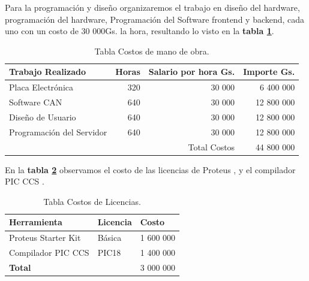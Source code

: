 Para la programación  y diseño organizaremos el trabajo en diseño del hardware, programación del hardware, Programación del Software frontend y backend, cada uno con un costo de 30 000Gs. la hora, resultando lo visto en la \textbf{tabla \ref{tabla:software}}. 

\begin{table}[H]
\begin{center}
\begin{tabular}{|l|r|r|r|}
\hline
\textbf{Trabajo Realizado} & \textbf{Horas}&\textbf{Salario por hora Gs.} & \textbf{Importe Gs.} \\ \hline

 Placa Electrónica & 320 & 30 000  & 6 400 000     \\ \hline
 Software CAN      & 640 & 30 000  & 12 800 000     \\ \hline
 Diseño de Usuario & 640 & 30 000  & 12 800 000     \\ \hline
 Programación del Servidor & 640 & 30 000 & 12 800 000 \\ \hline 
  &  & Total Costos & 44 800 000 \\ \hline 

\end{tabular}
\caption{Tabla Costos de mano de obra.}
\label{tabla:software}
\end{center}
\end{table}



En la \textbf{tabla \ref{tabla:licencias}} observamos el costo de las licencias de Proteus  \cite{licenp}, y el compilador PIC CCS \cite{pic_ccs}.
\begin{table}[H]
\begin{center}
\begin{tabular}{|l|l|l|}
\hline
\textbf{Herramienta} & \textbf{Licencia} & \textbf{Costo}  \\ \hline
Proteus Starter Kit  & Básica & 1 600 000  \\ \hline
Compilador PIC CCS   & PIC18  & 1 400 000  \\ \hline

\textbf{Total} &  &   3 000 000     \\ \hline
\end{tabular}
\caption{Tabla Costos de Licencias.}
\label{tabla:licencias}
\end{center}
\end{table}


